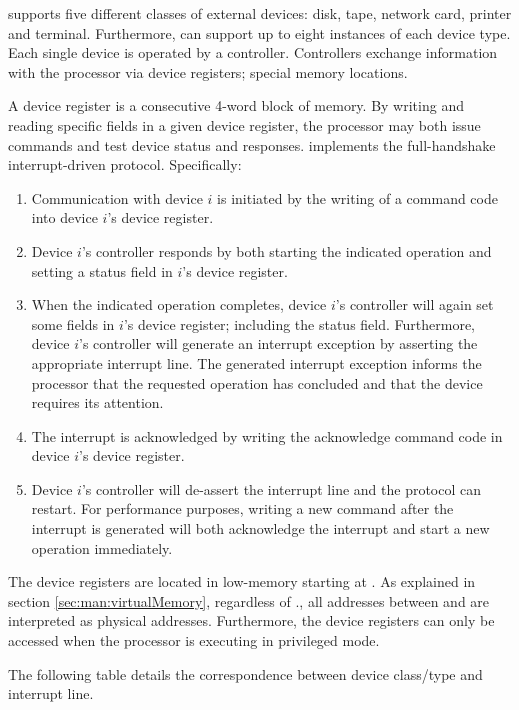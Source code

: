 \label{sec:man:devices}

\uarm{} supports five different classes of external devices: disk, tape, network card, printer and terminal. 
Furthermore, \uarm{} can support up to eight instances of each device type. 
Each single device is operated by a controller. 
Controllers exchange information with the processor via device registers; special memory locations.

A device register is a consecutive 4-word block of memory. 
By writing and reading specific fields in a given device register, the processor may both issue commands and test device status and responses.
\uarm{} implements the full-handshake interrupt-driven protocol. 
Specifically:
\begin{enumerate}
	\item Communication with device $i$ is initiated by the writing of a command code into device $i$’s device register.
	\item  Device $i$’s controller responds by both starting the indicated operation and setting a status field in $i$’s device register.
	\item When the indicated operation completes, device $i$’s controller will again set some fields in $i$’s device register; including the status field. Furthermore, device $i$’s controller will generate an interrupt exception by asserting the appropriate interrupt line. 
		The generated interrupt exception informs the processor that the requested operation has concluded and that the device requires its attention.
	\item The interrupt is acknowledged by writing the acknowledge command code in device $i$’s device register.
	\item Device $i$’s controller will de-assert the interrupt line and the protocol can restart. For performance purposes, writing a new command after the interrupt is generated will both acknowledge the interrupt and start a new operation immediately.
\end{enumerate}

The device registers are located in low-memory starting at . 
As explained in section \ref{sec:man:virtualMemory}, regardless of ., all addresses between  and  are interpreted as physical addresses. 
Furthermore, the device registers can only be accessed when the processor is executing in privileged mode.

The following table details the correspondence between device class/type and interrupt line.

